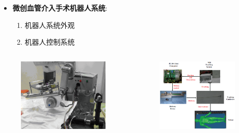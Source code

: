 \begin{frame}
\begin{itemize}
  \item \textbf{微创血管介入手术机器人系统}: 
  \begin{enumerate}
    \item 机器人系统外观
    \item 机器人控制系统
  \end{enumerate}
\end{itemize}
\begin{columns}[b,onlytextwidth]
\begin{column}{.5\textwidth}
\begin{figure}[t]
\centering
\includegraphics[height=100pt]{../../Figures/background/robot.eps}
\end{figure}
\end{column}
\begin{column}{.5\textwidth}
\begin{figure}[t]
\centering
\includegraphics[height=100pt]{../../Figures/background/robot_arch.eps}
\end{figure}
\end{column}
\end{columns}
\end{frame}

